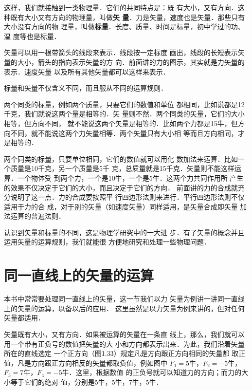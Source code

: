     这样，我们就接触到一类物理量．它们的共同特点是：既
有大小，又有方向．这种既有大小又有方向的物理量，叫做\textbf{矢
量}．力是矢量，速度也是矢量．那些只有大小没有方向的物
理量，叫做\textbf{标量}．长度、质量、时间是标量，初中学过的功、温
度等也是标量．

    矢量可以用一根带箭头的线段来表示．线段按一定标度
画出，线段的长短表示矢量的大小，箭头的指向表示矢量的方
向．前面讲的力的图示，其实就是力矢量的表示．速度矢量
以及所有其他矢量都可以这样来表示．

    标量和矢量不仅含义不同，而且服从不同的运算规则．

    两个同类的标量，例如两个质量，只要它们的数值和单位
都相同，比如说都是12千克，我们就说这两个量是相等的．矢
量则不然．两个同类的矢量，它们的大小相等，但方向不同，
就不能说这两个矢量是相等的．比如两个力都是15牛，但方
向不同，就不能说这两个力矢量相等．两个矢量只有大小相
等而且方向相同，才是相等的．

    两个同类的标量，只要单位相同，它们的数值就可以用化
数加法来运算．比如一个质量是10千克，另一个质量是5千
克，总质量就是15千克．矢量则不能这样运算．一个物体受
到两个力，一个是10牛，一个是5牛．这两个力共同作用所
产生的效果不仅决定于它们的大小，而且决定于它们的方向．
前面讲的力的合成就充分说明了这一点．力的合成要按照平
行四边形法则来进行．平行四边形法则不仅适用于力的合
成，对于别的矢量（如速度矢量）同样适用，是矢量合成即矢量
加法运算的普遍法则．

    认识到矢量和标量的不同，这是物理学研究中的一大进
步．有了矢量的概念并且运用矢量的运算规则，我们就能很
方便地研究和处理一些物理问题．

\section{同一直线上的矢量的运算}
    本书中常常要处理同一直线上的矢量，这一节我们以力
矢量为例讲一讲同一直线上的矢量的运算，以备以后的应用．
这里虽然是以力矢量为例来讲的，但对任何矢量都适用．

    矢量既有大小，又有方向．如果被运算的矢量在一条直
线上，那么，我们就可以用一个带有正负号的数值把矢量的大
小和方向都表示出来．为此，我们沿着矢量所在的直线选定
一个正方向（图1.33）规定凡是方向跟正方向相同的矢量都
取正值，凡是方向跟正方向相反的矢量都取负值，例如图中
$F_1=5$牛，$F_2=-5$牛，$F_3=7$牛，$F_4=-5$牛．这里，根据数值
的正负号就可以知道力的方向；而力的大小等于它们的绝对
值，分别是5牛，5牛，7牛，5牛．


